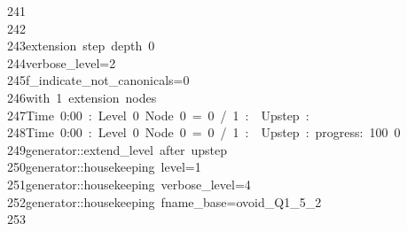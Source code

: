 \begin{tabbing}
241\>\\[0pt]
242\>\\[0pt]
243\>extension\ step\ depth\ 0\\[0pt]
244\>verbose\_level=2\\[0pt]
245\>f\_indicate\_not\_canonicals=0\\[0pt]
246\>with\ 1\ extension\ nodes\\[0pt]
247\>Time\ 0:00\ :\ Level\ 0\ Node\ 0\ =\ 0\ /\ 1\ :\ \ Upstep\ :\ \\[0pt]
248\>Time\ 0:00\ :\ Level\ 0\ Node\ 0\ =\ 0\ /\ 1\ :\ \ Upstep\ :\ progress:\ 100\ 0\ \ \\[0pt]
249\>generator::extend\_level\ after\ upstep\\[0pt]
250\>generator::housekeeping\ level=1\\[0pt]
251\>generator::housekeeping\ verbose\_level=4\\[0pt]
252\>generator::housekeeping\ fname\_base=ovoid\_Q1\_5\_2\\[0pt]
253\>\\[0pt]

\end{tabbing}
